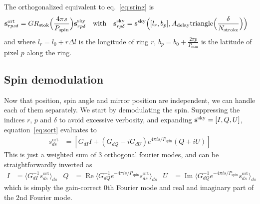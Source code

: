 \documentclass{article}
\renewcommand{\Re}{\operatorname{Re}}
\renewcommand{\Im}{\operatorname{Im}}
\renewcommand{\vec}[1]{{\bf #1}}
\begin{document}
The orthogonalized equivalent to eq.~\ref{eq:sring} is
\begin{align}
	\vec s^\textrm{ort}_{rps\delta} &= G R_\textrm{stok}
		\Big(\frac{4\pi s}{P_\textrm{spin}}\Big) \vec s^\textrm{sky}_{rp\delta} &
		\textrm{with} & &
	\vec s^\textrm{sky}_{rp\delta} &=
		\vec s^\textrm{sky}\Big([l_r,b_p],
		A_\textrm{delay}\textrm{triangle}\Big(\frac{\delta}{N_\textrm{stroke}}\Big)\Big)
	\label{eq:sort}
\end{align}
and where $l_r = l_0 + r\Delta l$ is the longitude of ring $r$,
$b_p = b_0 + \frac{2\pi p}{P_\textrm{scan}}$ is the latitude of pixel $p$
along the ring.

\subsection{Spin demodulation}
Now that position, spin angle and mirror position are independent, we can
handle each of them separately. We start by demodulating the spin.
Suppressing the indices $r$, $p$ and $\delta$ to avoid excessive
verbosity, and expanding $\vec s^\textrm{sky} = [I,Q,U]$, 
equation~\ref{eq:sort} evaluates to
\begin{align}
	s^\textrm{ort}_{ds} &= \left[G_{dI} I +
		(G_{dQ}-iG_{dU})e^{4\pi i s/P_\textrm{spin}} (Q + iU)\right]
\end{align}
This is just a weighted sum of 3 orthogonal fourier modes,
and can be straightforwardly inverted as
\begin{align}
	I &= \langle G_{dI}^{-1} s^\textrm{ort}_{ds}\rangle_{ds} &
	Q &= \Re \langle G_{dQ}^{-1}
			e^{-4\pi i s/P_\textrm{spin}} s^\textrm{ort}_{ds}\rangle_{ds} &
	U &= \Im \langle G_{dQ}^{-1}
			e^{-4\pi i s/P_\textrm{spin}} s^\textrm{ort}_{ds}\rangle_{ds}
\end{align}
which is simply the gain-correct 0th Fourier mode and
real and imaginary part of the 2nd Fourier mode.
\end{document}
